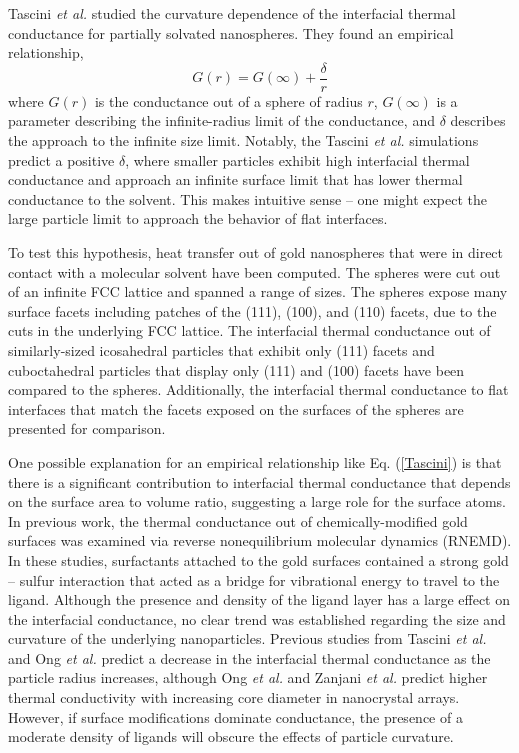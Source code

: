 Tascini \textit{et al.}\cite{Tascini2016} studied the
curvature dependence of the interfacial thermal conductance for
partially solvated nanospheres. They found an empirical relationship,
\begin{equation}
G(r) = G(\infty) + \frac{\delta}{r}
\label{Tascini}
\end{equation}
where $G(r)$ is the conductance out of a sphere of radius $r$,
$G(\infty)$ is a parameter describing the infinite-radius limit of the
conductance, and $\delta$ describes the approach to the infinite size
limit. Notably, the Tascini \textit{et al.} simulations predict a
positive $\delta$, where smaller particles exhibit high interfacial
thermal conductance and approach an infinite surface limit that has
lower thermal conductance to the solvent. This makes intuitive sense
-- one might expect the large particle limit to approach the behavior
of flat interfaces.

To test this hypothesis, heat transfer out of gold
nanospheres that were in direct contact with a molecular solvent have been computed. The
spheres were cut out of an infinite FCC lattice and spanned a range of
sizes.  The spheres
expose many surface facets including patches of the (111), (100), and
(110) facets, due to the cuts in the underlying FCC lattice.
The interfacial thermal conductance out of similarly-sized
 icosahedral particles that exhibit only (111) facets and cuboctahedral particles that display
only (111) and (100) facets have been compared to the spheres. 
Additionally, the interfacial thermal conductance to flat interfaces 
that match the facets exposed on the surfaces of the spheres are presented
for comparison.

One possible explanation for an empirical relationship like
Eq. (\ref{Tascini}) is that there is a significant contribution to
interfacial thermal conductance that depends on the surface area to
volume ratio, suggesting a large role for the surface atoms. In 
previous work, the thermal conductance out of chemically-modified gold
surfaces was examined via reverse nonequilibrium molecular dynamics
(RNEMD). \cite{kuang:AuThl,Stocker:2014qq,Stocker2016} %
In these studies, surfactants attached to the gold surfaces contained
a strong gold -- sulfur interaction that acted as a bridge for
vibrational energy to travel to the ligand.  Although the presence and
density of the ligand layer has a large effect on the interfacial
conductance, no clear trend was established regarding the size and
curvature of the underlying nanoparticles. Previous studies from
Tascini \textit{et al.}\cite{Tascini2016} and Ong \textit{et
  al.}\cite{Ong:2014yq} predict a decrease in the interfacial thermal
conductance as the particle radius increases, although Ong \textit{et
  al.}\cite{Ong:2014yq} and Zanjani \textit{et al.}\cite{Zanjani2014}
predict higher thermal conductivity with increasing core diameter in
nanocrystal arrays. However, if surface modifications dominate
conductance, the presence of a moderate density of ligands will
obscure the effects of particle curvature.

